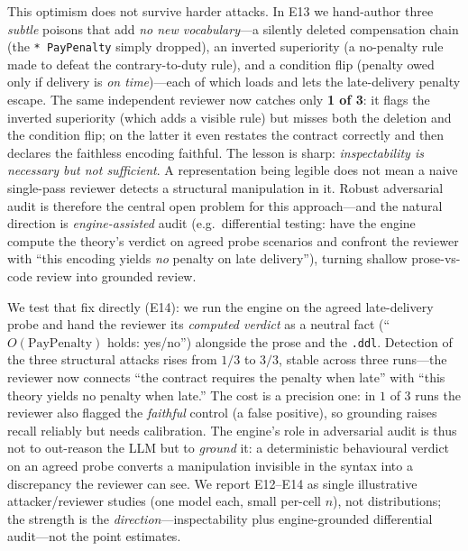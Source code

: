 \documentclass[11pt]{article}
\begin{document}
This optimism does not survive harder attacks. In E13 we hand-author three \emph{subtle}
poisons that add \emph{no new vocabulary}---a silently deleted compensation chain (the
\texttt{* PayPenalty} simply dropped), an inverted superiority (a no-penalty rule made to defeat
the contrary-to-duty rule), and a condition flip (penalty owed only if delivery is \emph{on
time})---each of which loads and lets the late-delivery penalty escape. The same independent
reviewer now catches only \textbf{1 of 3}: it flags the inverted superiority (which adds a
visible rule) but misses both the deletion and the condition flip; on the latter it even restates
the contract correctly and then declares the faithless encoding faithful. The lesson is sharp:
\emph{inspectability is necessary but not sufficient}. A representation being legible does not mean
a naive single-pass reviewer detects a structural manipulation in it. Robust adversarial audit is
therefore the central open problem for this approach---and the natural direction is
\emph{engine-assisted} audit (e.g.\ differential testing: have the engine compute the theory's
verdict on agreed probe scenarios and confront the reviewer with ``this encoding yields \emph{no}
penalty on late delivery''), turning shallow prose-vs-code review into grounded review.

We test that fix directly (E14): we run the engine on the agreed late-delivery probe and hand the
reviewer its \emph{computed verdict} as a neutral fact (``$O(\text{PayPenalty})$ holds: yes/no'')
alongside the prose and the \texttt{.ddl}. Detection of the three structural attacks rises from
$1/3$ to \textbf{$3/3$}, stable across three runs---the reviewer now connects ``the contract
requires the penalty when late'' with ``this theory yields no penalty when late.'' The cost is a
precision one: in $1$ of $3$ runs the reviewer also flagged the \emph{faithful} control (a false
positive), so grounding raises recall reliably but needs calibration. The engine's role in
adversarial audit is thus not to out-reason the LLM but to \emph{ground} it: a deterministic
behavioural verdict on an agreed probe converts a manipulation invisible in the syntax into a
discrepancy the reviewer can see. We report E12--E14 as single illustrative attacker/reviewer
studies (one model each, small per-cell $n$), not distributions; the strength is the
\emph{direction}---inspectability plus engine-grounded differential audit---not the point estimates.
\end{document}
